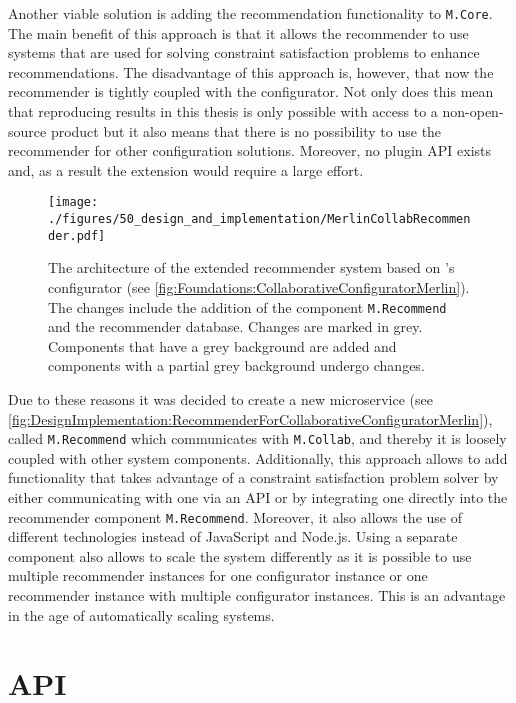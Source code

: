 Another viable solution is adding the recommendation functionality to \texttt{M.Core}. The main benefit of this approach is that it allows the recommender to use systems that are used for solving constraint satisfaction problems to enhance recommendations. The disadvantage of this approach is, however, that now the recommender is tightly coupled with the configurator. Not only does this mean that reproducing results in this thesis is only possible with access to a non-open-source product but it also means that there is no possibility to use the recommender for other configuration solutions. Moreover, no plugin API exists and, as a result the extension would require a large effort.


\begin{figure}[tb]
    \centering
    \texttt{[image: ./figures/50\_design\_and\_implementation/MerlinCollabRecommender.pdf]}
    \caption[Architecture: Recommender System and Configurator]{The architecture of the extended recommender system based on \citeauthor{raabKollaborativeProduktkonfigurationEchtzeit2019}'s configurator (see \autoref{fig:Foundations:CollaborativeConfiguratorMerlin}). The changes include the addition of the component \texttt{M.Recommend} and the recommender database. Changes are marked in grey. Components that have a grey background are added and components with a partial grey background undergo changes.}
    \label{fig:DesignImplementation:RecommenderForCollaborativeConfiguratorMerlin}
\end{figure}

Due to these reasons it was decided to create a new microservice (see \autoref{fig:DesignImplementation:RecommenderForCollaborativeConfiguratorMerlin}), called \texttt{M.Recommend} which communicates with \texttt{M.Collab}, and thereby it is loosely coupled with other system components. Additionally, this approach allows to add functionality that takes  advantage of a constraint satisfaction problem solver by either communicating with one via an API or by integrating one directly into the recommender component \texttt{M.Recommend}. Moreover, it also allows the use of different technologies instead of JavaScript and Node.js. Using a separate component also allows to scale the system differently as it is possible to use multiple recommender instances for one configurator instance or one recommender instance with multiple configurator instances. This is an advantage in the age of automatically scaling systems.


\section{API}
\label{sec:DesignImplementation:API}

